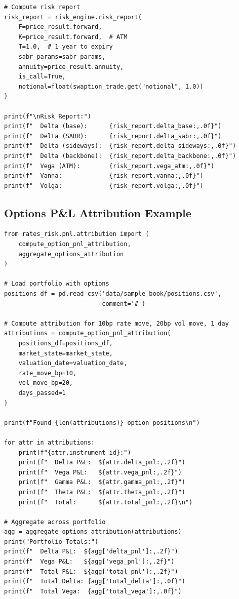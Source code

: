 \documentclass[12pt,a4paper]{report}
\begin{document}
\begin{lstlisting}
# Compute risk report
risk_report = risk_engine.risk_report(
    F=price_result.forward,
    K=price_result.forward,  # ATM
    T=1.0,  # 1 year to expiry
    sabr_params=sabr_params,
    annuity=price_result.annuity,
    is_call=True,
    notional=float(swaption_trade.get("notional", 1.0))
)

print(f"\nRisk Report:")
print(f"  Delta (base):      {risk_report.delta_base:,.0f}")
print(f"  Delta (SABR):      {risk_report.delta_sabr:,.0f}")
print(f"  Delta (sideways):  {risk_report.delta_sideways:,.0f}")
print(f"  Delta (backbone):  {risk_report.delta_backbone:,.0f}")
print(f"  Vega (ATM):        {risk_report.vega_atm:,.0f}")
print(f"  Vanna:             {risk_report.vanna:,.0f}")
print(f"  Volga:             {risk_report.volga:,.0f}")
\end{lstlisting}

\subsection{Options P\&L Attribution Example}

\begin{lstlisting}
from rates_risk.pnl.attribution import (
    compute_option_pnl_attribution,
    aggregate_options_attribution
)

# Load portfolio with options
positions_df = pd.read_csv('data/sample_book/positions.csv', 
                           comment='#')

# Compute attribution for 10bp rate move, 20bp vol move, 1 day
attributions = compute_option_pnl_attribution(
    positions_df=positions_df,
    market_state=market_state,
    valuation_date=valuation_date,
    rate_move_bp=10,
    vol_move_bp=20,
    days_passed=1
)

print(f"Found {len(attributions)} option positions\n")

for attr in attributions:
    print(f"{attr.instrument_id}:")
    print(f"  Delta P&L:  ${attr.delta_pnl:,.2f}")
    print(f"  Vega P&L:   ${attr.vega_pnl:,.2f}")
    print(f"  Gamma P&L:  ${attr.gamma_pnl:,.2f}")
    print(f"  Theta P&L:  ${attr.theta_pnl:,.2f}")
    print(f"  Total:      ${attr.total_pnl:,.2f}\n")

# Aggregate across portfolio
agg = aggregate_options_attribution(attributions)
print("Portfolio Totals:")
print(f"  Delta P&L:  ${agg['delta_pnl']:,.2f}")
print(f"  Vega P&L:   ${agg['vega_pnl']:,.2f}")
print(f"  Total P&L:  ${agg['total_pnl']:,.2f}")
print(f"  Total Delta: {agg['total_delta']:,.0f}")
print(f"  Total Vega:  {agg['total_vega']:,.0f}")
\end{lstlisting}
\end{document}
